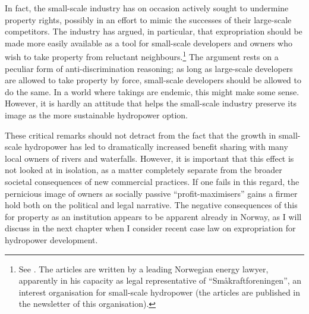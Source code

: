In fact, the small-scale industry has on occasion actively sought to undermine property rights, possibly in an effort to mimic the successes of their large-scale competitors. The industry has argued, in particular, that expropriation should be made more easily available as a tool for small-scale developers and owners who wish to take property from reluctant neighbours.\footnote{See \cite{brekken07,brekken08}. The articles are written by a leading Norwegian energy lawyer, apparently in his capacity as legal representative of ``Småkraftforeningen'', an interest organisation for small-scale hydropower (the articles are published in the newsletter of this organisation).} The argument rests on a peculiar form of anti-discrimination reasoning; as long as large-scale developers are allowed to take property by force, small-scale developers should be allowed to do the same. In a world where takings are endemic, this might make some sense. However, it is hardly an attitude that helps the small-scale industry preserve its image as the more sustainable hydropower option.


These critical remarks should not detract from the fact that the growth in small-scale hydropower has led to dramatically increased benefit sharing with many local owners of rivers and waterfalls. However, it is important that this effect is not looked at in isolation, as a matter completely separate from the broader societal consequences of new commercial practices. If one fails in this regard, the pernicious image of owners as socially passive ``profit-maximisers'' gains a firmer hold both on the political and legal narrative. The negative consequences of this for property as an institution appears to be apparent already in Norway, as I will discuss in the next chapter when I consider recent case law on expropriation for hydropower development.

